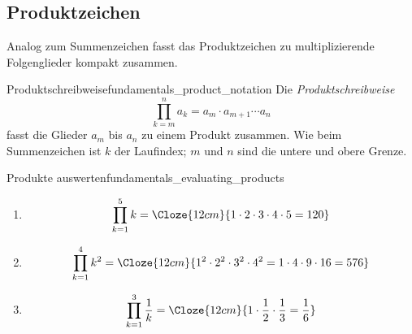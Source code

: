 \subsection{Produktzeichen}
\label{subsec:fundamentals_product_notation}

Analog zum Summenzeichen fasst das Produktzeichen zu multiplizierende
Folgenglieder kompakt zusammen.

\begin{DefinitionBox}{Produktschreibweise}{fundamentals_product_notation}
  Die \emph{Produktschreibweise} 
  \[
    \prod_{k=m}^{n}a_k
      =a_m\cdot a_{m+1}\cdots a_n
  \]
  fasst die Glieder $a_m$ bis $a_n$ zu einem Produkt zusammen. Wie beim
  Summenzeichen ist $k$ der Laufindex; $m$ und $n$ sind die untere und obere
  Grenze.
\end{DefinitionBox}

\begin{ExampleBox}{Produkte auswerten}{fundamentals_evaluating_products}
  \begin{enumerate}[label=\alph*),leftmargin=2em,itemsep=0.8em]
    \item\leavevmode
      \[
        \prod_{k=1}^{5}k
          =\Cloze{12cm}{1\cdot2\cdot3\cdot4\cdot5=120}
      \]
    \item\leavevmode
      \[
        \prod_{k=1}^{4}k^2
          =\Cloze{12cm}{1^2\cdot2^2\cdot3^2\cdot4^2
            =1\cdot4\cdot9\cdot16=576}
      \]
    \item\leavevmode
      \[
        \prod_{k=1}^{3}\frac1k
          =\Cloze{12cm}{1\cdot\frac12\cdot\frac13=\frac16}
      \]
  \end{enumerate}
\end{ExampleBox}
